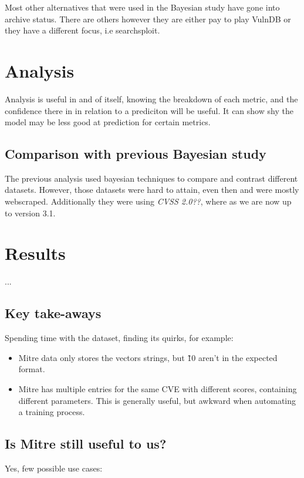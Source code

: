 \documentclass[11pt]{article}
\begin{document}
Most other alternatives that were used in the Bayesian study have gone into archive status. There
are others however they are either pay to play VulnDB or they have a different focus, i.e
searchsploit.

\section{Analysis}

Analysis is useful in and of itself, knowing the breakdown of each metric, and the confidence there
in in relation to a prediciton will be useful. It can show shy the model may be less good at
prediction for certain metrics.

\subsection{Comparison with previous Bayesian study}

The previous analysis used bayesian techniques to compare and contrast different datasets. However,
those datasets were hard to attain, even then and were mostly webscraped. Additionally they were
using \textit{CVSS 2.0??}, where as we are now up to version 3.1.

\section{Results}
...


\subsection{Key take-aways}

Spending time with the dataset, finding its quirks, for example:

\begin{itemize}
	\item Mitre data only stores the vectors strings, but \~10 aren't in the expected format.
	\item Mitre has multiple entries for the same CVE with different scores, containing different
	      parameters. This is generally useful, but awkward when automating a training process.
\end{itemize}

\subsection{Is Mitre still useful to us?}

Yes, few possible use cases:
\end{document}
